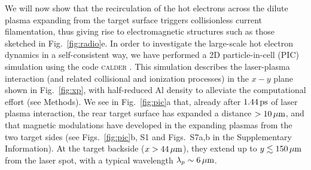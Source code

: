 \documentclass[aps,twocolumn,showpacs,superscriptaddress]{revtex4}
\begin{document}
We will now show that the recirculation of the hot electrons across the dilute plasma expanding from the target surface triggers collisionless current filamentation, thus giving rise to electromagnetic structures such as those sketched in Fig.~\ref{fig:radio}e. In order to investigate the large-scale hot electron dynamics in a self-consistent way, we have performed a 2D particle-in-cell (PIC) simulation using the code \textsc{calder} \cite{NF_Lefebvre_2003}. This simulation describes the laser-plasma interaction (and related collisional and ionization processes) in the $x-y$ plane shown in Fig.~\ref{fig:xp}, with half-reduced Al density to alleviate the computational effort (see Methods).
We see in Fig.~\ref{fig:pic}a that, already after $1.44\,\rm ps$ of laser plasma interaction, the rear target surface has expanded a distance $>10\,\rm \mu m$, and that magnetic modulations have developed in the expanding plasmas from the two target sides (see Figs.~\ref{fig:pic}b, S1 and  Figs.~S7a,b in the Supplementary Information). At the target backside ($x>44\,\rm \mu m$), they extend up to $y \lesssim 150\,\rm \mu m$ from the laser spot, with a typical wavelength $\lambda_p \sim 6\,\rm \mu m$.
\end{document}
